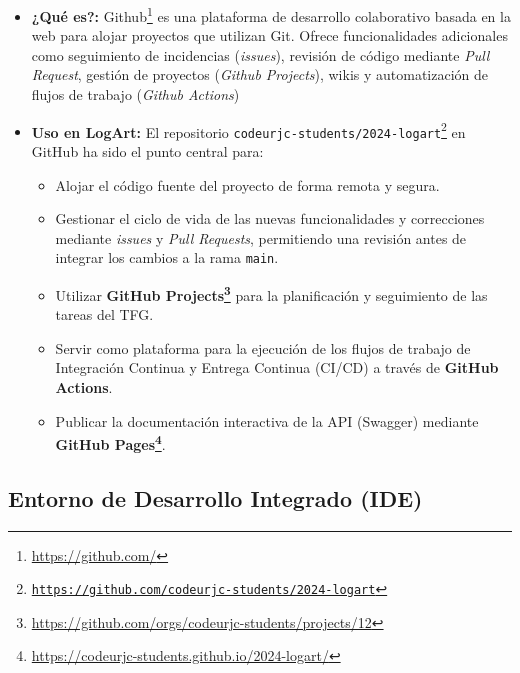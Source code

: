 \begin{itemize}
\begin{itemize}
                \item \textbf{¿Qué es?:} Github\footnote{\url{https://github.com/}} es una plataforma de desarrollo colaborativo basada en la web para alojar proyectos que utilizan Git. Ofrece funcionalidades adicionales como seguimiento de incidencias (\textit{issues}), revisión de código mediante \textit{Pull Request}, gestión de proyectos (\textit{Github Projects}), wikis y automatización de flujos de trabajo (\textit{Github Actions})
                \item \textbf{Uso en LogArt:} El repositorio \texttt{codeurjc-students/2024-logart\footnote{\url{https://github.com/codeurjc-students/2024-logart}}} en GitHub ha sido el punto central para:
                    \begin{itemize}
                        \item Alojar el código fuente del proyecto de forma remota y segura.
                        \item Gestionar el ciclo de vida de las nuevas funcionalidades y correcciones mediante \textit{issues} y \textit{Pull Requests}, permitiendo una revisión antes de integrar los cambios a la rama \texttt{main}.
                        \item Utilizar \textbf{GitHub Projects\footnote{\url{https://github.com/orgs/codeurjc-students/projects/12}}} para la planificación y seguimiento de las tareas del TFG.
                        \item Servir como plataforma para la ejecución de los flujos de trabajo de Integración Continua y Entrega Continua (CI/CD) a través de \textbf{GitHub Actions}.
                        \item Publicar la documentación interactiva de la API (Swagger) mediante \textbf{GitHub Pages\footnote{\url{https://codeurjc-students.github.io/2024-logart/}}}.
                    \end{itemize}
            \end{itemize}
    \end{itemize}

\subsection{Entorno de Desarrollo Integrado (IDE)}
\label{sec:ide}

